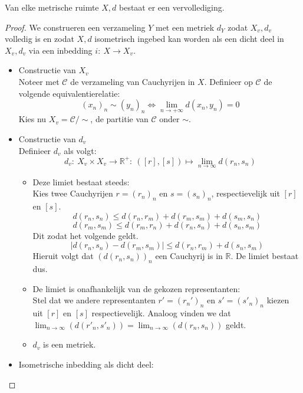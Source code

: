 \documentclass[main.tex]{subfiles}
\begin{document}
\begin{bst}
  Van elke metrische ruimte $X,d$ bestaat er een vervollediging.

  \begin{proof}
    We construeren een verzameling $Y$ met een metriek $d_{Y}$ zodat $X_{v},d_{v}$ volledig is en zodat $X,d$ isometrisch ingebed kan worden als een dicht deel in $X_{v},d_{v}$ via een inbedding $i:\ X \rightarrow X_{v}$.

    \begin{itemize}
    \item Constructie van $X_{v}$\\
      Noteer met $\mathcal{C}$ de verzameling van Cauchyrijen in $X$.
      Definieer op $\mathcal{C}$ de volgende equivalentierelatie:
      \[ (x_{n})_{n} \sim (y_{n})_{n} \Leftrightarrow \lim_{n\rightarrow +\infty}d(x_{n},y_{n}) = 0 \]
      Kies nu $X_{v} = \mathcal{C} / \sim$, de partitie van $\mathcal{C}$ onder $\sim$.
    \item Constructie van $d_{v}$\\
      Definieer $d_{v}$ als volgt:
      \[ d_{v}:\ X_{v}\times X_{v} \rightarrow \mathbb{R}^{+}:\ ([r],[s]) \mapsto \lim_{n\rightarrow \infty}d(r_{n},s_{n}) \]
      \begin{itemize}
      \item Deze limiet bestaat steeds:\\
        Kies twee Cauchyrijen $r = (r_{n})_{n}$ en $s = (s_{n})_{n}$, respectievelijk uit $[r]$ en $[s]$.
        \[ d(r_{n},s_{n}) \le d(r_{n},r_{m}) + d(r_{m},s_{m}) + d(s_{m},s_{n}) \]
        \[ d(r_{m},s_{m}) \le d(r_{m},r_{n}) + d(r_{n},s_{n}) + d(s_{n},s_{m}) \]
        Dit zodat het volgende geldt.
        \[ |d(r_{n},s_{n}) - d(r_{m},s_{m})| \le d(r_{n},r_{m}) + d(s_{n},s_{m}) \]
        Hieruit volgt dat $(d(r_{n},s_{n}))_{n}$ een Cauchyrij is in $\mathbb{R}$.
        De limiet bestaat dus.
      \item De limiet is onafhankelijk van de gekozen representanten:\\
        Stel dat we andere representanten $r' = (r_{n}')_{n}$ en $s'=(s'_{n})_{n}$ kiezen uit $[r]$ en $[s]$ respectievelijk.
        Analoog vinden we dat $\lim_{n\rightarrow \infty}(d(r'_{n},s'_{n})) = \lim_{n\rightarrow \infty}(d(r_{n},s_{n}))$ geldt.
      \item $d_{v}$ is een metriek.
      \end{itemize}
    \item Isometrische inbedding als dicht deel:

\end{itemize}
\end{proof}
\end{bst}
\end{document}

